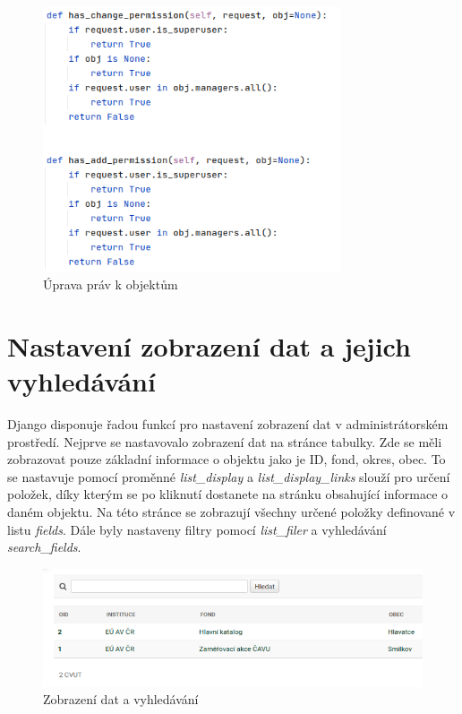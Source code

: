 \begin{figure}[H] \centering
    \includegraphics[width=250pt]{./pictures/14-object-permissions.PNG}
    \caption[Úprava práv k objektům]{Úprava práv k objektům}
	\label{fig:Úprava práv k objektům}              
\end{figure}


\section{Nastavení zobrazení dat a jejich vyhledávání}

Django disponuje řadou funkcí pro nastavení zobrazení dat v administrátorském prostředí. Nejprve se nastavovalo zobrazení dat na stránce tabulky. Zde se měli zobrazovat pouze základní informace o objektu jako je ID, fond, okres, obec. To se nastavuje pomocí proměnné \emph{list\_display} a \emph{list\_display\_links} slouží pro určení položek, díky kterým se po kliknutí dostanete na stránku obsahující informace o daném objektu. Na této stránce se zobrazují všechny určené položky definované v listu \emph{fields}. Dále byly nastaveny filtry pomocí \emph{list\_filer} a vyhledávání \emph{search\_fields}. 

\begin{figure}[H] \centering
    \includegraphics[width=400pt]{./pictures/21-zobrazeni-dat.PNG}
    \caption[Zobrazení dat a vyhledávání]{Zobrazení dat a vyhledávání}
	\label{fig:Zobrazení dat a vyhledávání}              
\end{figure}

